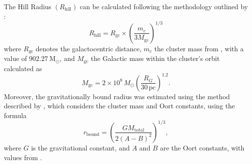 \documentclass[fleqn,usenatbib,usedcolumn,useAMS]{mnras}
\begin{document}
The Hill Radius $(R_\mathrm{hill})$  can be calculated following the methodology outlined by \citet{2019A&A...627A.119C}:
\begin{equation}
R_\mathrm{hill} = R_{\mathrm{gc}} \times \left(\frac{m_c}{3M_{\mathrm{gc}}}\right)^{1/3}
\end{equation}
where $ R_{\mathrm{gc}} $ denotes the galactocentric distance, $ m_c $ the cluster mass from \citet{2024arXiv240305143H}, with a value of $902.27~\mathrm{M_{\odot}}$, and $ M_{\mathrm{gc}} $ the Galactic mass within the cluster's orbit calculated as
\begin{equation}
	M_{\mathrm{gc}} = 2  \times 10^8\,M_\odot \left(\frac{R_G}{30\,\mathrm{pc}}\right)^{1.2}.
\end{equation}
Moreover, the gravitationally bound radius was estimated using the method described by \citet{1998MNRAS.299..955P}, which considers the cluster mass and Oort constants, using the formula
\begin{equation}
	r_\mathrm{bound} = \left( \frac{GM_{\mathrm{total}}}{2(A-B)^2} \right)^{1/3},
\end{equation}
where $G$ is the gravitational constant, and $A$ and $B$ are the Oort constants, with values from \citet{2017MNRAS.468L..63B}.
\end{document}
